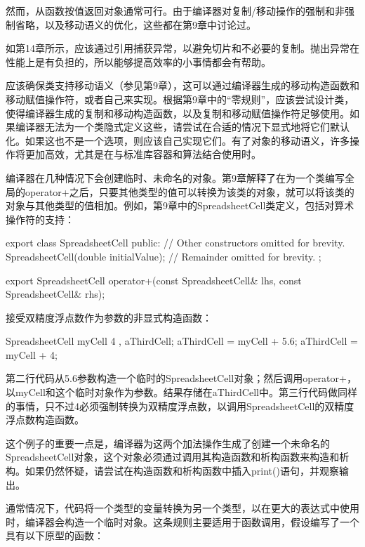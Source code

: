 然而，从函数按值返回对象通常可行。由于编译器对复制/移动操作的强制和非强制省略，以及移动语义的优化，这些都在第9章中讨论过。


如第14章所示，应该通过引用捕获异常，以避免切片和不必要的复制。抛出异常在性能上是有负担的，所以能够提高效率的小事情都会有帮助。


应该确保类支持移动语义（参见第9章），这可以通过编译器生成的移动构造函数和移动赋值操作符，或者自己来实现。根据第9章中的“零规则”，应该尝试设计类，使得编译器生成的复制和移动构造函数，以及复制和移动赋值操作符足够使用。如果编译器无法为一个类隐式定义这些，请尝试在合适的情况下显式地将它们默认化。如果这也不是一个选项，则应该自己实现它们。有了对象的移动语义，许多操作将更加高效，尤其是在与标准库容器和算法结合使用时。


编译器在几种情况下会创建临时、未命名的对象。第9章解释了在为一个类编写全局的operator+之后，只要其他类型的值可以转换为该类的对象，就可以将该类的对象与其他类型的值相加。例如，第9章中的SpreadsheetCell类定义，包括对算术操作符的支持：

\begin{cpp}
export class SpreadsheetCell
{
    public:
        // Other constructors omitted for brevity.
        SpreadsheetCell(double initialValue);
        // Remainder omitted for brevity.
};

export SpreadsheetCell operator+(const SpreadsheetCell& lhs,
    const SpreadsheetCell& rhs);
\end{cpp}

接受双精度浮点数作为参数的非显式构造函数：

\begin{cpp}
SpreadsheetCell myCell { 4 }, aThirdCell;
aThirdCell = myCell + 5.6;
aThirdCell = myCell + 4;
\end{cpp}

第二行代码从5.6参数构造一个临时的SpreadsheetCell对象；然后调用operator+，以myCell和这个临时对象作为参数。结果存储在aThirdCell中。第三行代码做同样的事情，只不过4必须强制转换为双精度浮点数，以调用SpreadsheetCell的双精度浮点数构造函数。

这个例子的重要一点是，编译器为这两个加法操作生成了创建一个未命名的SpreadsheetCell对象，这个对象必须通过调用其构造函数和析构函数来构造和析构。如果仍然怀疑，请尝试在构造函数和析构函数中插入print()语句，并观察输出。

通常情况下，代码将一个类型的变量转换为另一个类型，以在更大的表达式中使用时，编译器会构造一个临时对象。这条规则主要适用于函数调用，假设编写了一个具有以下原型的函数：

